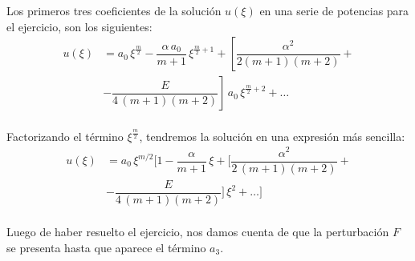 
Los primeros tres coeficientes de la solución $u(\xi)$ en una serie de potencias para el ejercicio, son los siguientes:
\begin{align*}
u(\xi) &= a_{0} \, \xi^{\frac{m}{2}} - \dfrac{\alpha \, a_{0}}{m + 1} \, \xi^{\frac{m}{2}+1} + \left[ \dfrac{\alpha^{2}}{2(m + 1)(m + 2)} + \right. \\[1em]
&- \left. \dfrac{E}{4 \, (m + 1)(m + 2)} \right] \, a_{0} \, \xi^{\frac{m}{2}+2} + \ldots
\end{align*}
\\
Factorizando el término $\xi^{\frac{m}{2}}$, tendremos la solución en una expresión más sencilla:
\begin{align*}
u(\xi) &= a_{0} \, \xi^{m/2}  \bigg[ 1 - \dfrac{\alpha}{m + 1} \, \xi + \bigg[ \dfrac{\alpha^{2}}{2 \, (m + 1)(m + 2)} + \\[1em]
&- \dfrac{E}{4 \, (m + 1)(m + 2)} \bigg] \, \xi^{2} + \ldots \bigg]
\end{align*}
\\
Luego de haber resuelto el ejercicio, nos damos cuenta de que la perturbación $F$ se presenta hasta que aparece el término $a_{3}$.
